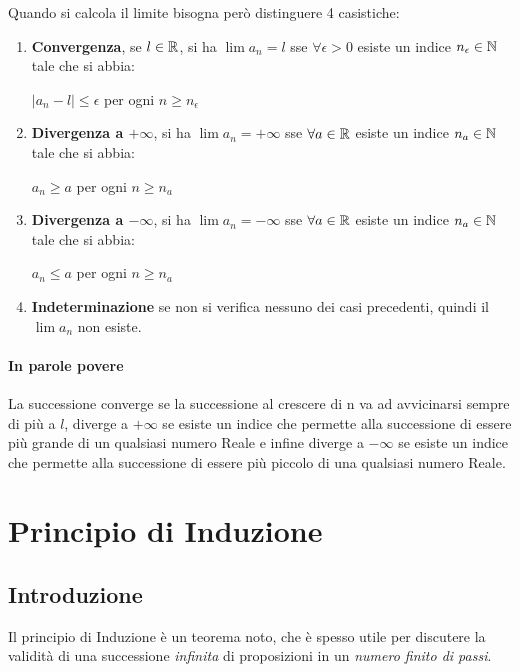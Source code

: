 \documentclass[12pt, a4paper, openany]{book}
\begin{document}
Quando si calcola il limite bisogna però distinguere 4 casistiche:
\begin{enumerate}
	\item \textbf{Convergenza}, se $l\in\mathbb{R}$, si ha $\lim a_n = l$ sse $\forall \epsilon > 0$ esiste un indice $n_\epsilon\in\mathbb{N}$ tale che si abbia:
	      \begin{center}
		      $|a_n-l|\leq\epsilon$ per ogni $n \geq n_\epsilon$
	      \end{center}
	\item \textbf{Divergenza a $+\infty$}, si ha $\lim a_n = +\infty$ sse $\forall a\in \mathbb{R}$ esiste un indice $n_a\in\mathbb{N}$ tale che si abbia:
	      \begin{center}
		      $a_n\geq a$ per ogni $n \geq n_a$
	      \end{center}
	\item \textbf{Divergenza a $-\infty$}, si ha $\lim a_n = -\infty$ sse $\forall a\in \mathbb{R}$ esiste un indice $n_a\in\mathbb{N}$ tale che si abbia:
	      \begin{center}
		      $a_n\leq a$ per ogni $n \geq n_a$
	      \end{center}
	\item \textbf{Indeterminazione} se non si verifica nessuno dei casi precedenti, quindi il $\lim a_n$ non esiste.
\end{enumerate}
\paragraph*{In parole povere} La successione converge se la successione al crescere di n va ad avvicinarsi sempre di più a $l$,
diverge a $+\infty$ se esiste un indice che permette alla successione di essere più grande di un qualsiasi numero Reale
e infine diverge a $-\infty$ se esiste un indice che permette alla successione di essere più piccolo di una qualsiasi numero Reale.

\section{Principio di Induzione}
\subsection*{Introduzione}
Il principio di Induzione è un teorema noto, che è spesso utile per discutere la validità di una successione \emph{infinita} di proposizioni in un \emph{numero finito di passi}.

\end{document}
